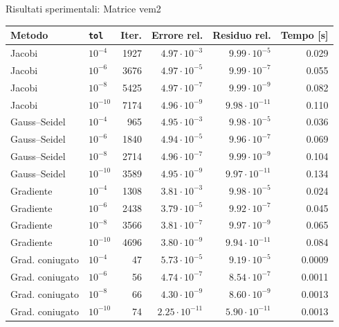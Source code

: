 \documentclass[11pt,aspectratio=169,xcolor=dvipsnames]{beamer}
\begin{document}
\begin{frame}{Risultati sperimentali: Matrice vem2}
    \begin{table}
        \centering
        \scriptsize
        \begin{tabular}{llrrrr}
        \toprule
        Metodo & \texttt{tol} & Iter. & Errore rel. & Residuo rel. & Tempo [s] \\
        \midrule
        Jacobi & $10^{-4}$ & 1927 & $4.97\cdot10^{-3}$ & $9.99\cdot10^{-5}$ & 0.029 \\
        Jacobi & $10^{-6}$ & 3676 & $4.97\cdot10^{-5}$ & $9.99\cdot10^{-7}$ & 0.055 \\
        Jacobi & $10^{-8}$ & 5425 & $4.97\cdot10^{-7}$ & $9.99\cdot10^{-9}$ & 0.082 \\
        Jacobi & $10^{-10}$ & 7174 & $4.96\cdot10^{-9}$ & $9.98\cdot10^{-11}$ & 0.110 \\
        \midrule
        Gauss--Seidel & $10^{-4}$ & 965 & $4.95\cdot10^{-3}$ & $9.98\cdot10^{-5}$ & 0.036 \\
        Gauss--Seidel & $10^{-6}$ & 1840 & $4.94\cdot10^{-5}$ & $9.96\cdot10^{-7}$ & 0.069 \\
        Gauss--Seidel & $10^{-8}$ & 2714 & $4.96\cdot10^{-7}$ & $9.99\cdot10^{-9}$ & 0.104 \\
        Gauss--Seidel & $10^{-10}$ & 3589 & $4.95\cdot10^{-9}$ & $9.97\cdot10^{-11}$ & 0.134 \\
        \midrule
        Gradiente & $10^{-4}$ & 1308 & $3.81\cdot10^{-3}$ & $9.98\cdot10^{-5}$ & 0.024 \\
        Gradiente & $10^{-6}$ & 2438 & $3.79\cdot10^{-5}$ & $9.92\cdot10^{-7}$ & 0.045 \\
        Gradiente & $10^{-8}$ & 3566 & $3.81\cdot10^{-7}$ & $9.97\cdot10^{-9}$ & 0.065 \\
        Gradiente & $10^{-10}$ & 4696 & $3.80\cdot10^{-9}$ & $9.94\cdot10^{-11}$ & 0.084 \\
        \midrule
        Grad. coniugato & $10^{-4}$ & 47 & $5.73\cdot10^{-5}$ & $9.19\cdot10^{-5}$ & 0.0009 \\
        Grad. coniugato & $10^{-6}$ & 56 & $4.74\cdot10^{-7}$ & $8.54\cdot10^{-7}$ & 0.0011 \\
        Grad. coniugato & $10^{-8}$ & 66 & $4.30\cdot10^{-9}$ & $8.60\cdot10^{-9}$ & 0.0013 \\
        Grad. coniugato & $10^{-10}$ & 74 & $2.25\cdot10^{-11}$ & $5.90\cdot10^{-11}$ & 0.0013 \\
        \bottomrule
        \end{tabular}
    \end{table}
\end{frame}
\end{document}
